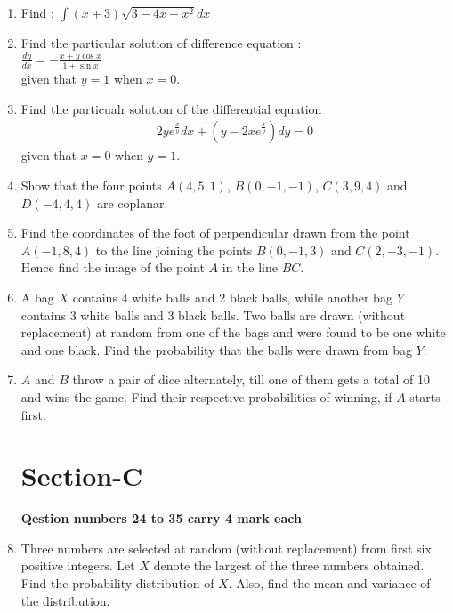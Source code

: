 \documentclass[journal,12pt,twocolumn]{IEEEtran}
\renewcommand\thesection{\arabic{section}}
\begin{document}
\begin{enumerate}[label=\thesection.\arabic*.,ref=\thesection.\theenumi]
\item Find : $\int (x+3)\sqrt{3 - 4x - x^2} dx$\\

\item Find the particular solution of difference equation :\\
 $\frac{dy}{dx} = - \frac{x + y\cos x}{1 + \sin x}$ \\
 given that $y = 1$ when $x = 0$.

\item Find the particualr solution of the differential equation
	\begin{align}
		2y e^{\frac{x}{y}} dx + (y -2x e^{\frac{x}{y}}) dy = 0
	\end{align}
given that $x = 0$ when $y = 1$.

\item Show that the four points $A(4,5,1)$, $ B(0,-1,-1)$, 
$C(3,9,4)$ and $D(-4,4,4)$ are coplanar.

\item Find the coordinates of the foot of perpendicular drawn from the point
$A(-1, 8, 4)$ to the line joining the points $B(0, -1, 3)$ and $C(2,-3,-1)$. Hence
find the image of the point $A$ in the line $BC$.

\item A bag $X$ contains 4 white balls and 2 black balls, while another bag $Y$ contains
3 white balls and 3 black balls. Two balls are drawn (without replacement) at
random from one of the bags and were found to be one white and one black.
Find the probability that the balls were drawn from bag $Y$.

\item $A$ and $B$ throw a pair of dice alternately, till one of them gets a total of 10 and
wins the game. Find their respective probabilities of winning, if $A$ starts first.


\section{Section-C}
\textbf{Qestion numbers 24 to 35 carry 4 mark each}\\

\item Three numbers are selected at random (without replacement) from first six
positive integers. Let $X$ denote the largest of the three numbers obtained. Find
the probability distribution of $X$. Also, find the mean and variance of the
distribution.


\end{enumerate}
\end{document}
